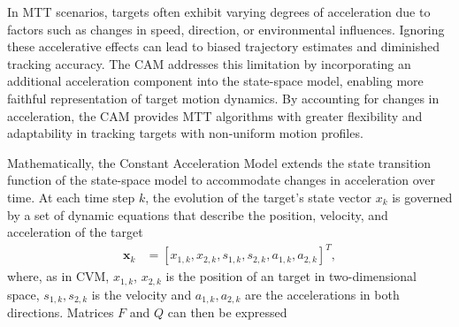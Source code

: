 In MTT scenarios, targets often exhibit varying degrees of acceleration due to factors such as changes in speed,
direction, or environmental influences. Ignoring these accelerative effects can lead to biased trajectory estimates and diminished tracking accuracy. The CAM addresses this limitation by incorporating an additional acceleration component into the state-space model, enabling more faithful representation of target motion dynamics. By accounting for changes in acceleration, the CAM provides MTT algorithms with greater flexibility and adaptability in tracking targets with non-uniform motion profiles.

Mathematically, the Constant Acceleration Model extends the state transition function of the state-space model to
accommodate changes in acceleration over time. At each time step $k$, the evolution of the target's state vector $x_k$ is governed by a set of dynamic equations that describe the position, velocity, and acceleration of the target
\begin{align}
    \mathbf{x}_k &= [x_{1,k}, x_{2,k}, s_{1,k}, s_{2,k}, a_{1,k}, a_{2,k}]^T,
\end{align}
where, as in CVM, $x_{1,k}$, $x_{2,k}$ is the position of an target in two-dimensional space, $s_{1,k}, s_{2,k}$ is
the velocity and $a_{1,k}, a_{2,k}$ are the accelerations in both directions. Matrices $F$ and $Q$ can then be expressed
